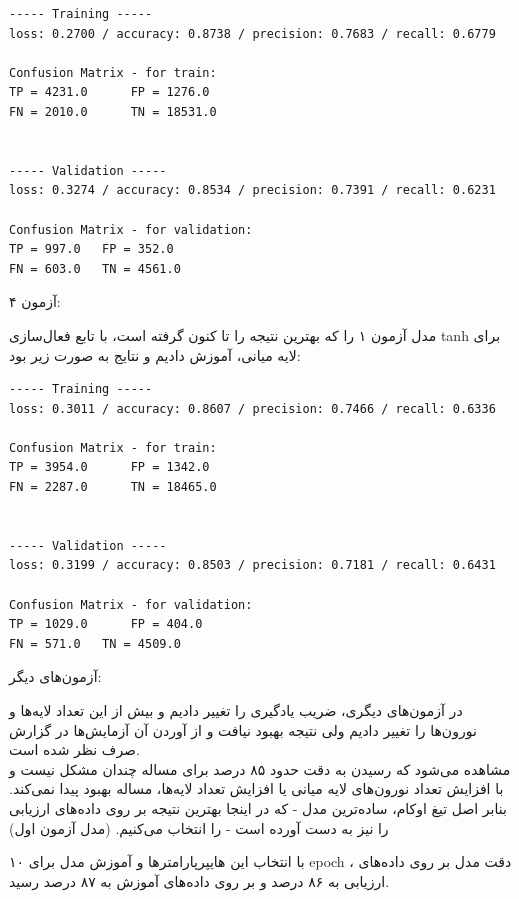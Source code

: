 \documentclass{article}
\begin{document}
\begin{latin}
\begin{lstlisting}
----- Training -----
loss: 0.2700 / accuracy: 0.8738 / precision: 0.7683 / recall: 0.6779

Confusion Matrix - for train:
TP = 4231.0 	 FP = 1276.0
FN = 2010.0 	 TN = 18531.0


----- Validation -----
loss: 0.3274 / accuracy: 0.8534 / precision: 0.7391 / recall: 0.6231

Confusion Matrix - for validation:
TP = 997.0 	 FP = 352.0
FN = 603.0 	 TN = 4561.0
\end{lstlisting}
\end{latin}

\bigbreak

آزمون ۴:

مدل آزمون ۱ را که بهترین نتیجه را تا کنون گرفته است، با تابع فعال‌سازی tanh برای لایه میانی، آموزش دادیم و نتایج به صورت زیر بود:

\begin{latin}
\begin{lstlisting}
----- Training -----
loss: 0.3011 / accuracy: 0.8607 / precision: 0.7466 / recall: 0.6336

Confusion Matrix - for train:
TP = 3954.0 	 FP = 1342.0
FN = 2287.0 	 TN = 18465.0


----- Validation -----
loss: 0.3199 / accuracy: 0.8503 / precision: 0.7181 / recall: 0.6431

Confusion Matrix - for validation:
TP = 1029.0 	 FP = 404.0
FN = 571.0 	 TN = 4509.0
\end{lstlisting}
\end{latin}

\bigbreak


آزمون‌های دیگر:

در آزمون‌های دیگری، ضریب یادگیری را تغییر دادیم و بیش از این تعداد لایه‌ها و نورون‌ها را تغییر دادیم ولی نتیجه بهبود نیافت و از آوردن آن آزمایش‌ها در گزارش صرف نظر شده است.\\ 

مشاهده می‌شود که رسیدن به دقت حدود ۸۵ درصد برای مساله چندان مشکل نیست و با افزایش تعداد نورون‌های لایه میانی یا افزایش تعداد لایه‌ها، مساله بهبود پیدا نمی‌کند. بنابر اصل تیغ اوکام، ساده‌ترین مدل - که در اینجا بهترین نتیجه بر روی داده‌های ارزیابی را نیز به دست آورده است - را انتخاب می‌کنیم. (مدل آزمون اول)

با انتخاب این هایپرپارامترها و آموزش مدل برای ۱۰ epoch ، دقت مدل بر روی داده‌های ارزیابی به ۸۶ درصد و بر روی داده‌های آموزش به ۸۷ درصد رسید. \\
\end{document}
